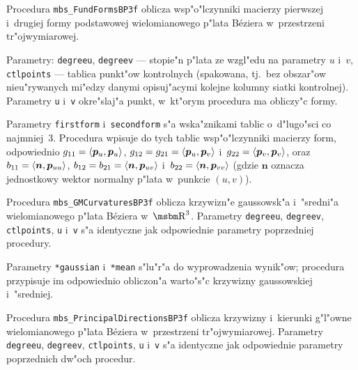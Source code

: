 \vspace{\bigskipamount}
Procedura \texttt{mbs\_FundFormsBP3f} oblicza wsp"o"lczynniki macierzy
pierwszej i~drugiej formy podstawowej wielomianowego p"lata B\'{e}ziera
w~przestrzeni tr"ojwymiarowej.

Parametry: \texttt{degreeu}, \texttt{degreev} --- stopie"n p"lata ze
wzgl"edu na parametry $u$ i~$v$, \texttt{ctlpoints} --- tablica punkt"ow
kontrolnych (spakowana, tj.\ bez obszar"ow nieu"rywanych mi"edzy danymi
opisuj"acymi kolejne kolumny siatki kontrolnej). Parametry \texttt{u}
i~\texttt{v} okre"slaj"a punkt, w~kt"orym procedura ma obliczy"c formy.

Parametry \texttt{firstform} i~\texttt{secondform} s"a wska"znikami tablic
o~d"lugo"sci co najmniej~$3$. Procedura wpisuje do tych tablic
wsp"o"lczynniki macierzy form, odpowiednio
$g_{11}=\langle{\bm{p}_u},{\bm{p}_u}\rangle$, $g_{12}=g_{21}=\langle{\bm{p}_u},{\bm{p}_v}\rangle$
i~$g_{22}=\langle{\bm{p}_v},{\bm{p}_v}\rangle$, oraz
$b_{11}=\langle{\bm{n}},{\bm{p}_{uu}}\rangle$, $b_{12}=b_{21}=\langle{\bm{n}},{\bm{p}_{uv}}\rangle$
i~$b_{22}=\langle{\bm{n}},{\bm{p}_{vv}}\rangle$ (gdzie $\bm{n}$ oznacza jednostkowy
wektor normalny p"lata w~punkcie $(u,v)$).


\vspace{\bigskipamount}
Procedura \texttt{mbs\_GMCurvaturesBP3f} oblicza krzywizn"e gaussowsk"a
i~"sredni"a wielomianowego p"lata B\'{e}ziera w~$\R^3$. Parametry
\texttt{degreeu}, \texttt{degreev}, \texttt{ctlpoints}, \texttt{u}
i~\texttt{v} s"a identyczne jak odpowiednie parametry poprzedniej procedury.

Parametry \texttt{*gaussian} i~\texttt{*mean} s"lu"r"a do wyprowadzenia
wynik"ow; procedura przypisuje im odpowiednio obliczon"a warto"s"c krzywizny
gaussowskiej i~"sredniej.


\vspace{\bigskipamount}
Procedura \texttt{mbs\_PrincipalDirectionsBP3f} oblicza krzywizny i~kierunki
g"l"owne wielomianowego p"lata B\'{e}ziera w~przestrzeni tr"ojwymiarowej. 
Parametry \texttt{degreeu}, \texttt{degreev}, \texttt{ctlpoints}, \texttt{u}
i~\texttt{v} s"a identyczne jak odpowiednie parametry poprzednich dw"och
procedur.

